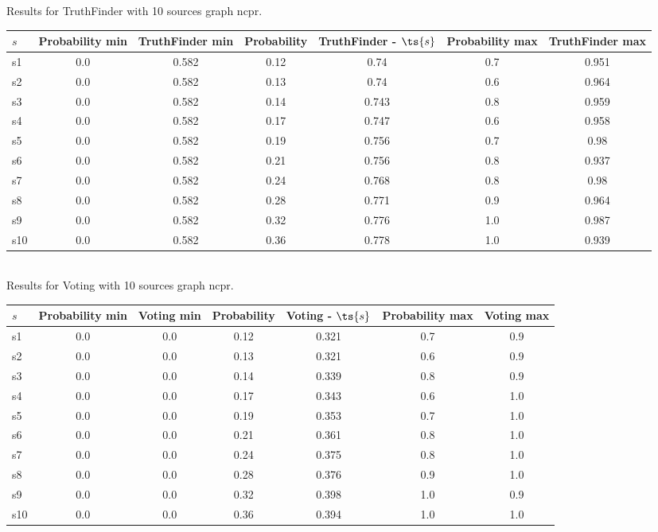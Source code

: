 \documentclass{article}
\begin{document}
\noindent Results for TruthFinder with 10 sources graph ncpr.

\noindent\begin{tabular}{|l|c|c|c|c|c|c|}
\hline
$s$& Probability min & TruthFinder min & Probability & TruthFinder - $\ts{s}$ & Probability max & TruthFinder max\\
\hline
s1 &0.0 & 0.582 & 0.12 & 0.74 & 0.7 & 0.951\\
\hline
s2 &0.0 & 0.582 & 0.13 & 0.74 & 0.6 & 0.964\\
\hline
s3 &0.0 & 0.582 & 0.14 & 0.743 & 0.8 & 0.959\\
\hline
s4 &0.0 & 0.582 & 0.17 & 0.747 & 0.6 & 0.958\\
\hline
s5 &0.0 & 0.582 & 0.19 & 0.756 & 0.7 & 0.98\\
\hline
s6 &0.0 & 0.582 & 0.21 & 0.756 & 0.8 & 0.937\\
\hline
s7 &0.0 & 0.582 & 0.24 & 0.768 & 0.8 & 0.98\\
\hline
s8 &0.0 & 0.582 & 0.28 & 0.771 & 0.9 & 0.964\\
\hline
s9 &0.0 & 0.582 & 0.32 & 0.776 & 1.0 & 0.987\\
\hline
s10 &0.0 & 0.582 & 0.36 & 0.778 & 1.0 & 0.939\\
\hline
\end{tabular}\\

\noindent Results for Voting with 10 sources graph ncpr.

\noindent\begin{tabular}{|l|c|c|c|c|c|c|}
\hline
$s$& Probability min & Voting min & Probability & Voting - $\ts{s}$ & Probability max & Voting max\\
\hline
s1 &0.0 & 0.0 & 0.12 & 0.321 & 0.7 & 0.9\\
\hline
s2 &0.0 & 0.0 & 0.13 & 0.321 & 0.6 & 0.9\\
\hline
s3 &0.0 & 0.0 & 0.14 & 0.339 & 0.8 & 0.9\\
\hline
s4 &0.0 & 0.0 & 0.17 & 0.343 & 0.6 & 1.0\\
\hline
s5 &0.0 & 0.0 & 0.19 & 0.353 & 0.7 & 1.0\\
\hline
s6 &0.0 & 0.0 & 0.21 & 0.361 & 0.8 & 1.0\\
\hline
s7 &0.0 & 0.0 & 0.24 & 0.375 & 0.8 & 1.0\\
\hline
s8 &0.0 & 0.0 & 0.28 & 0.376 & 0.9 & 1.0\\
\hline
s9 &0.0 & 0.0 & 0.32 & 0.398 & 1.0 & 0.9\\
\hline
s10 &0.0 & 0.0 & 0.36 & 0.394 & 1.0 & 1.0\\
\hline
\end{tabular}\\
\end{document}
